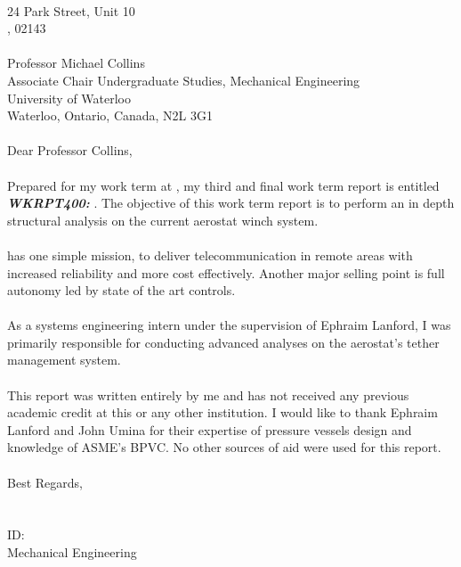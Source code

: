 \begin{declaration}

	\Company\\
	24 Park Street, Unit 10\\
	\CompanyCity , 02143\\
	\\ 
    Professor Michael Collins\\
	Associate Chair Undergraduate Studies, Mechanical Engineering\\
	University of Waterloo\\
	Waterloo, Ontario, Canada, N2L 3G1\\
	\\ 
    Dear Professor Collins,\\ 
    \\
    Prepared for my \Term work term at \textbf{\textsl{\Company}}, my third and final work term report is
	entitled \textbf{\textsl{WKRPT400: \ReportTitle}}. The objective of this work term report is to perform an in depth structural analysis on the current aerostat winch system.\\ 
	\\
	\Company  has one simple mission, to deliver telecommunication in remote areas with increased reliability and more cost effectively. Another major selling point is full autonomy led by state of the art controls.\\
	\\
	As a systems engineering intern under the supervision of Ephraim Lanford, I was primarily responsible for conducting advanced analyses on the aerostat's tether management system.\\ 
	\\
	This report was written entirely by me and has not received any previous academic credit at this or
	any other institution. I would like to thank Ephraim Lanford and John Umina for their expertise of pressure vessels design and knowledge of ASME's BPVC. No other sources of aid were used for this report.\\ 
	\\
	Best Regards,\\
	\\
	\Seb\\
	ID: \\
	\Term Mechanical Engineering\\
	
	\thispagestyle{empty}
	
\end{declaration}

